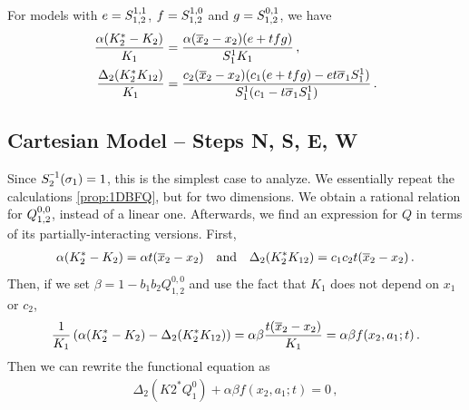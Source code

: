 \begin{lem} For \highSym models with $e = S_{1,2}^{1,1}$, $f = S_{1,2}^{1,0}$ and $g = S_{1,2}^{0,1}$, we have
\begin{align}
	\frac{\alpha(K_2^\ast -K_2)}{K_1}  &= \frac{\alpha (\overline{x}_2 - x_2)(e + tfg)}{S_1^1K_1}\,,\\
	\frac{\Delta_2(K_2^\ast K_{12})}{K_1} &= \frac{c_2(\overline{x}_2-x_2)(c_1(e + tfg)- et \overline{\sigma}_1S_1^1)}{S_1^1(c_1-t\overline{\sigma}_1S_1^1)}\,.
\end{align}
\end{lem}
\subsection{Cartesian Model -- Steps N, S, E, W}
Since $S_2^{\um 1}(\sigma_1) = 1$, this is the simplest case to analyze. We essentially repeat the calculations \autoref{prop:1DBFQ}, but for two dimensions. We obtain a rational relation for $Q_{1,2}^{0,0}$, instead of a linear one. Afterwards, we find an expression for $Q$ in terms of its partially-interacting versions. First,
\begin{align}
	\alpha(K_2^\ast - K_2) = \alpha t(\overline{x}_2- x_2) \quad\text{and}\quad \Delta_2(K_2^\ast K_{12}) = c_1c_2t(\overline{x}_2 - x_2)\,.
\end{align}
Then, if we set $\beta = 1-b_1b_2 Q_{1,2}^{0,0}$ and use the fact that $K_1$ does not depend on $x_1$ or $c_2$,
\begin{align}
	\frac{1}{K_1}\left(\alpha(K_2^\ast - K_2) - \Delta_2(K_2^\ast K_{12})\right) = \alpha \beta \frac{t (\overline{x}_2 - x_2)}{K_1} = \alpha \beta f(x_2, a_1;t)\,.
\end{align}
Then we can rewrite the functional equation as
\begin{align}
	\Delta_2(K2^\ast Q_1^0) +\alpha\beta f(x_2,a_1;t) = 0\,,
\end{align}


